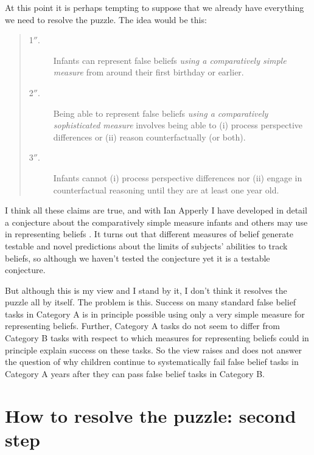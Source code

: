 \documentclass[12pt,\papersize]{extarticle}
\begin{document}
At this point it is perhaps tempting to suppose that we already have everything we need to resolve the puzzle.
The idea would be this:
%
\begin{quote}
\begin{description}
\item[1$''$.] Infants can represent false beliefs \emph{using a comparatively simple measure} from around their first birthday or earlier.
%
\item[2$''$.] Being able to represent false beliefs \emph{using a comparatively sophisticated measure}  involves being able to  (i) process perspective differences or (ii) reason counterfactually (or both). 
%
\item[3$''$.] Infants cannot (i) process perspective differences nor (ii) engage in counterfactual reasoning until they are at least one year old.  
\end{description}
\end{quote}
%
I think all these claims are true, and with Ian Apperly I have developed in detail a conjecture about the comparatively simple measure infants and others may use in representing beliefs \citep{butterfill_minimal}.
It turns out that different measures of belief generate testable and novel predictions about the limits of subjects' abilities to track beliefs, so although we haven't tested the conjecture yet it is a testable conjecture.

But although this is my view and I stand by it, I don't think it resolves the puzzle all by itself.
The problem is this.
Success on many standard false belief tasks in Category A is in principle possible using only a very simple measure for representing beliefs.
Further, Category A tasks do not seem to differ from Category B tasks with respect to which measures for representing beliefs could in principle explain success on these tasks.
So the view raises and does not answer the question of why children continue to systematically fail false belief tasks in Category A years after they can pass false belief tasks in Category B.



\section{How to resolve the puzzle: second step}
\end{document}
